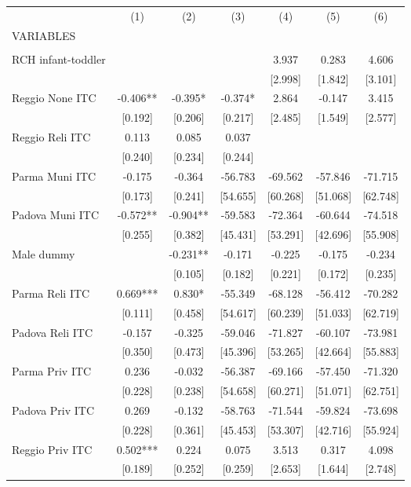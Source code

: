 \begin{tabular}{lcccccc} \hline
 & (1) & (2) & (3) & (4) & (5) & (6) \\
VARIABLES &  &  &  &  &  &  \\ \hline
 &  &  &  &  &  &  \\
RCH infant-toddler &  &  &  & 3.937 & 0.283 & 4.606 \\
 &  &  &  & [2.998] & [1.842] & [3.101] \\
Reggio None ITC & -0.406** & -0.395* & -0.374* & 2.864 & -0.147 & 3.415 \\
 & [0.192] & [0.206] & [0.217] & [2.485] & [1.549] & [2.577] \\
Reggio Reli ITC & 0.113 & 0.085 & 0.037 &  &  &  \\
 & [0.240] & [0.234] & [0.244] &  &  &  \\
Parma Muni ITC & -0.175 & -0.364 & -56.783 & -69.562 & -57.846 & -71.715 \\
 & [0.173] & [0.241] & [54.655] & [60.268] & [51.068] & [62.748] \\
Padova Muni ITC & -0.572** & -0.904** & -59.583 & -72.364 & -60.644 & -74.518 \\
 & [0.255] & [0.382] & [45.431] & [53.291] & [42.696] & [55.908] \\
Male dummy &  & -0.231** & -0.171 & -0.225 & -0.175 & -0.234 \\
 &  & [0.105] & [0.182] & [0.221] & [0.172] & [0.235] \\
Parma Reli ITC & 0.669*** & 0.830* & -55.349 & -68.128 & -56.412 & -70.282 \\
 & [0.111] & [0.458] & [54.617] & [60.239] & [51.033] & [62.719] \\
Padova Reli ITC & -0.157 & -0.325 & -59.046 & -71.827 & -60.107 & -73.981 \\
 & [0.350] & [0.473] & [45.396] & [53.265] & [42.664] & [55.883] \\
Parma Priv ITC & 0.236 & -0.032 & -56.387 & -69.166 & -57.450 & -71.320 \\
 & [0.228] & [0.238] & [54.658] & [60.271] & [51.071] & [62.751] \\
Padova Priv ITC & 0.269 & -0.132 & -58.763 & -71.544 & -59.824 & -73.698 \\
 & [0.228] & [0.361] & [45.453] & [53.307] & [42.716] & [55.924] \\
Reggio Priv ITC & 0.502*** & 0.224 & 0.075 & 3.513 & 0.317 & 4.098 \\
 & [0.189] & [0.252] & [0.259] & [2.653] & [1.644] & [2.748] \\

\end{tabular}
